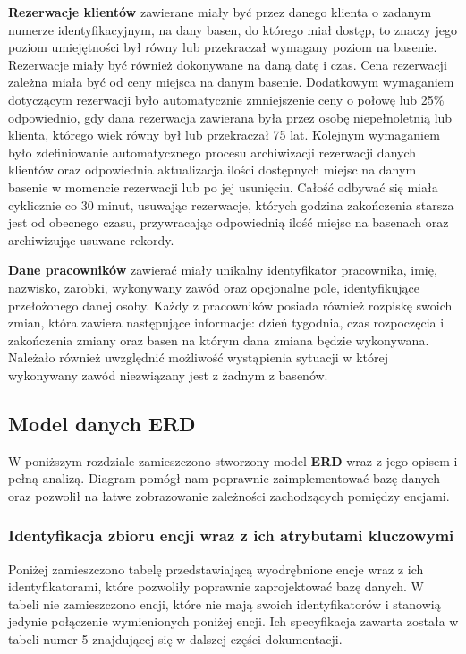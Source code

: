 \documentclass[a4paper]{article}
\begin{document}
\clearpage

\textbf{Rezerwacje klientów} zawierane miały być przez danego klienta o zadanym numerze identyfikacyjnym, na dany basen, do którego miał dostęp, to znaczy jego poziom umiejętności był równy lub przekraczał wymagany poziom na basenie. Rezerwacje miały być również dokonywane na daną datę i czas. Cena rezerwacji zależna miała być od ceny miejsca na danym basenie. Dodatkowym wymaganiem dotyczącym rezerwacji było automatycznie zmniejszenie ceny o połowę lub 25\% odpowiednio, gdy dana rezerwacja zawierana była przez osobę niepełnoletnią lub klienta, którego wiek równy był lub przekraczał 75 lat. Kolejnym wymaganiem było zdefiniowanie automatycznego procesu archiwizacji rezerwacji danych klientów oraz odpowiednia aktualizacja ilości dostępnych miejsc na danym basenie w momencie rezerwacji lub po jej usunięciu. Całość odbywać się miała cyklicznie co 30 minut, usuwając rezerwacje, których godzina zakończenia starsza jest od obecnego czasu, przywracając odpowiednią ilość miejsc na basenach oraz archiwizując usuwane rekordy.

\textbf{Dane pracowników} zawierać miały unikalny identyfikator pracownika, imię, nazwisko, zarobki, wykonywany zawód oraz opcjonalne pole, identyfikujące przełożonego danej osoby. Każdy z pracowników posiada również rozpiskę swoich zmian, która zawiera następujące informacje: dzień tygodnia, czas rozpoczęcia i zakończenia zmiany oraz basen na którym dana zmiana będzie wykonywana. Należało również uwzględnić możliwość wystąpienia sytuacji w której wykonywany zawód niezwiązany jest z żadnym z basenów.

\subsection{Model danych \textbf{ERD}}

W poniższym rozdziale zamieszczono stworzony model \textbf{ERD} wraz z jego opisem i pełną analizą. Diagram pomógł nam poprawnie zaimplementować bazę danych oraz pozwolił na łatwe zobrazowanie zależności zachodzących pomiędzy encjami.

\subsubsection{Identyfikacja zbioru encji wraz z ich atrybutami kluczowymi}

Poniżej zamieszczono tabelę przedstawiającą wyodrębnione encje wraz z ich identyfikatorami, które pozwoliły poprawnie zaprojektować bazę danych. W tabeli nie zamieszczono encji, które nie mają swoich identyfikatorów i stanowią jedynie połączenie wymienionych poniżej encji. Ich specyfikacja zawarta została w tabeli numer 5 znajdującej się w dalszej części dokumentacji.
\end{document}

